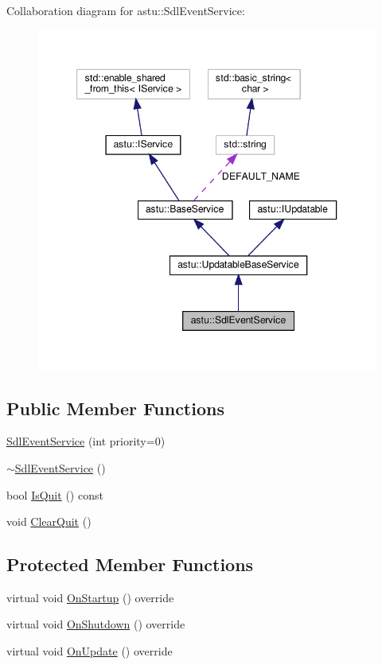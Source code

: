 Collaboration diagram for astu\+:\+:Sdl\+Event\+Service\+:\nopagebreak
\begin{figure}[H]
\begin{center}
\leavevmode
\includegraphics[width=347pt]{classastu_1_1SdlEventService__coll__graph}
\end{center}
\end{figure}
\subsection*{Public Member Functions}
\begin{DoxyCompactItemize}
\item 
\hyperlink{classastu_1_1SdlEventService_ad8da3cc63eb9810ba27a80bfeb68122d}{Sdl\+Event\+Service} (int priority=0)
\item 
\hyperlink{classastu_1_1SdlEventService_a388605cdc2ed3eb6fc70d2a020047552}{$\sim$\+Sdl\+Event\+Service} ()
\item 
bool \hyperlink{classastu_1_1SdlEventService_ac7b0eaae46bff34cc0d305a3dc3cea68}{Is\+Quit} () const
\item 
void \hyperlink{classastu_1_1SdlEventService_afe744162d9089344bfc32f6d65111ff6}{Clear\+Quit} ()
\end{DoxyCompactItemize}
\subsection*{Protected Member Functions}
\begin{DoxyCompactItemize}
\item 
virtual void \hyperlink{classastu_1_1SdlEventService_a71805a124600a23e48158daa5dc57fff}{On\+Startup} () override
\item 
virtual void \hyperlink{classastu_1_1SdlEventService_a0163bd191605b5068d93cd6c8f26da0c}{On\+Shutdown} () override
\item 
virtual void \hyperlink{classastu_1_1SdlEventService_a67090f42250433506b8bfb4254df9e50}{On\+Update} () override
\end{DoxyCompactItemize}

